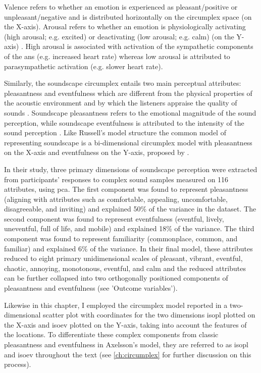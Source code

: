 Valence refers to whether an emotion is experienced as pleasant/positive or unpleasant/negative and is distributed horizontally on the circumplex space (on the X-axis). Arousal refers to whether an emotion is physiologically activating (high arousal; e.g. excited) or deactivating (low arousal; e.g. calm) (on the Y-axis) \citep{Russell1980circumplex}. High arousal is associated with activation of the sympathetic components of the \gls{ans} (e.g. increased heart rate) whereas low arousal is attributed to parasympathetic activation (e.g. slower heart rate). 

Similarly, the soundscape circumplex entails two main perceptual attributes: pleasantness and eventfulness which are different from the physical properties of the acoustic environment and by which the listeners appraise the quality of sounds \citep{ISO12913Part2}. Soundscape pleasantness refers to the emotional magnitude of the sound perception, while soundscape eventfulness is attributed to the intensity of the sound perception \citep{Erfanian2019Psychophysiological}. Like Russell's model structure the common model of representing soundscape is a bi-dimensional circumplex model with pleasantness on the X-axis and eventfulness on the Y-axis, proposed by \citet{Axelsson2010principal}. 

In their study, three primary dimensions of soundscape perception were extracted from participants' responses to complex sound samples measured on 116 attributes, using \gls{pca}. The first component was found to represent pleasantness (aligning with attributes such as comfortable, appealing, uncomfortable, disagreeable, and inviting) and explained 50\% of the variance in the dataset. The second component was found to represent eventfulness (eventful, lively, uneventful, full of life, and mobile) and explained 18\% of the variance. The third component was found to represent familiarity (commonplace, common, and familiar) and explained 6\% of the variance. In their final model, these attributes reduced to eight primary unidimensional scales of pleasant, vibrant, eventful, chaotic, annoying, monotonous, eventful, and calm and the reduced attributes can be further collapsed into two orthogonally positioned components of pleasantness and eventfulness (see 'Outcome variables').

Likewise in this chapter, I employed the circumplex model reported in a two-dimensional scatter plot with coordinates for the two dimensions \gls{isopl} plotted on the X-axis and \gls{isoev} plotted on the Y-axis, taking into account the features of the locations. To differentiate these complex components from classic pleasantness and eventfulness in Axelsson's model, they are referred to as \gls{isopl} and \gls{isoev} throughout the text (see \cref{ch:circumplex} for further discussion on this process).

